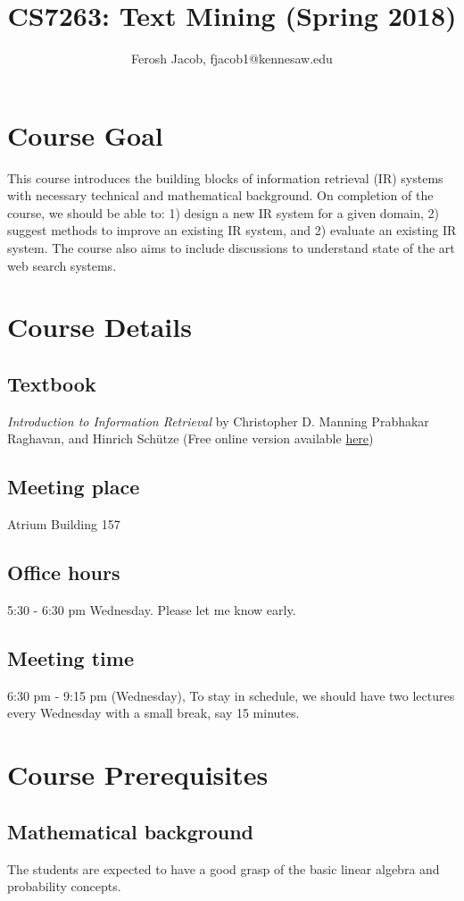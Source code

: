 \documentclass[12pt]{article}
\title{CS7263: Text Mining (Spring 2018)}
\author{Ferosh Jacob, fjacob1@kennesaw.edu}
\begin{document}
 

\maketitle

\section{Course Goal} 
This course introduces the building blocks of information retrieval (IR) systems with necessary technical and mathematical background. On completion of the course, we should be able to: 1) design a new IR system for a given domain, 2) suggest methods to improve an existing IR system, and  2) evaluate an existing IR system. The course also aims to include discussions to understand state of the art web search systems.

\section{Course Details}


     \subsection{Textbook} \textit{Introduction to Information Retrieval} by Christopher D. Manning Prabhakar Raghavan, and Hinrich Sch\"utze (Free online version available \href{https://nlp.stanford.edu/IR-book/}{here})
     \subsection{Meeting place} Atrium Building 157
    \subsection{Office hours} 5:30 - 6:30 pm Wednesday. Please let me know early.
         \subsection{Meeting time} 6:30 pm - 9:15 pm (Wednesday), To stay in schedule, we should have two lectures every Wednesday with a small break, say 15 minutes.

\section{Course Prerequisites}

\subsection{Mathematical background}
The students are expected to have a good grasp of the basic linear algebra and probability concepts.
\end{document}
